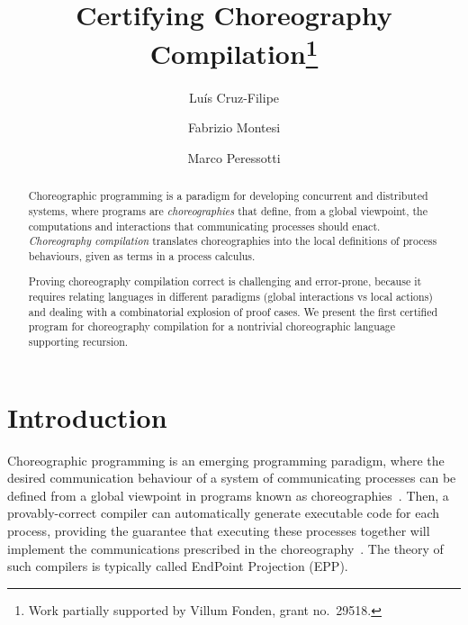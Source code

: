 \documentclass[runningheads]{llncs}
\begin{document}
\title{Certifying Choreography Compilation\thanks{Work partially supported by Villum Fonden, grant no.\ 29518.}}

\author{Luís Cruz-Filipe
\and
Fabrizio Montesi
\and
Marco Peressotti
}



\maketitle

\begin{abstract}
Choreographic programming is a paradigm for developing concurrent and distributed systems, where programs are \emph{choreographies} that define, from a global viewpoint, the computations and interactions that communicating processes should enact.
\emph{Choreography compilation} translates choreographies into the local definitions of process behaviours, given as terms in a process calculus.

Proving choreography compilation correct is challenging and error-prone, because it requires relating languages in different paradigms (global interactions vs local actions) and dealing with a combinatorial explosion of proof cases.
We present the first certified program for choreography compilation for a nontrivial choreographic language supporting recursion.
\end{abstract}

\section{Introduction}\label{sec:intro}
Choreographic programming is an emerging programming paradigm, where the desired communication behaviour of a system of communicating processes can be defined from a global viewpoint in programs known as choreographies~\cite{M13p}.
Then, a provably-correct compiler can automatically generate executable code for each process, providing the guarantee that executing these processes together will implement the communications prescribed in the choreography~\cite{CHY12,CM13}. The theory of such compilers is typically called EndPoint Projection (EPP).
\end{document}
